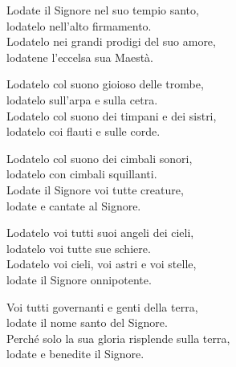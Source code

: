 

\spazio

\strofa Lodate il Signore nel suo tempio santo,\\
lodatelo nell'alto firmamento.\\
Lodatelo nei grandi prodigi del suo amore,\\
lodatene l'eccelsa sua Maestà.

\spazio


\spazio

\strofa Lodatelo col suono gioioso delle trombe,\\
lodatelo sull'arpa e sulla cetra.\\
Lodatelo col suono dei timpani e dei sistri,\\
lodatelo coi flauti e sulle corde.

\spazio


\spazio

\strofa Lodatelo col suono dei cimbali sonori,\\
lodatelo con cimbali squillanti.\\
Lodate il Signore voi tutte creature,\\
lodate e cantate al Signore.

\spazio


\spazio

\strofa Lodatelo voi tutti suoi angeli dei cieli,\\
lodatelo voi tutte sue schiere.\\
Lodatelo voi cieli, voi astri e voi stelle,\\
lodate il Signore onnipotente.

\spazio


\spazio

\strofa Voi tutti governanti e genti della terra,\\
lodate il nome santo del Signore.\\
Perché solo la sua gloria risplende sulla terra,\\
lodate e benedite il Signore.

\spazio

